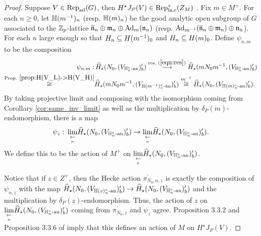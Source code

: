 \documentclass[10pt]{amsart}
\begin{document}
\begin{proof}
Suppose $V\in \textnormal{Rep}_{\textnormal{ad}}(G)$, then $H^{\star}J_{P}(V)\in \textnormal{Rep}_{\textnormal{la,c}}^{z}(Z_{M})$ \cite[Prop. 3.2.4]{Jacquet1}. Fix $m\in M^{+}$. For each $n\geq 0$, let $\mathbb{H}(m^{-1})_{n}$ (resp. $\mathbb{H}(m)_{n}$) be the good analytic open subgroup of $G$ associated to the $\mathbb{Z}_{p}$-lattice $\overline{\mathfrak{n}}_{n}\oplus \mathfrak{m}_{n} \oplus \textnormal{Ad}_{m}(\mathfrak{n}_{n})$ (resp. $\textnormal{Ad}_{m^{-1}}(\overline{\mathfrak{n}}_{n}\oplus \mathfrak{m}_{n}) \oplus \mathfrak{n}_{n}$). For each $n$ large enough so that $H_{n}\subseteq H(m^{-1})_{0}$ and $H_{n}\subseteq H(m)_{0}$. Define $\psi_{n,m}$ to be the composition \begin{equation*}\begin{split}
    \psi_{n,m}: &\, \widehat{H}_{\star}(N_{0},(V_{\mathbb{H}_{n}^{\circ}\textnormal{-an}})^{\prime}_{b}) \overset{\textnormal{res, }(\ref{eqn:res})}{\longrightarrow} \widehat{H}_{\star}(mN_{0}m^{-1},(V_{\mathbb{H}_{n}^{\circ}\textnormal{-an}})^{\prime}_{b})  \\ 
    \overset{\textnormal{Prop. } \ref{prop:H(V_L)->H(V_H)}}{\cong} &  \widehat{H}_{\star}(mN_{0}m^{-1},(V_{\mathbb{H}(m^{-1})_{n}^{\circ}\textnormal{-an}})^{\prime}_{b})\overset{m^{-1}}{\cong} \widehat{H}_{\star}(N_{0},(V_{\mathbb{H}(m)_{n}^{\circ}\textnormal{-an}})^{\prime}_{b}).
\end{split} 
\end{equation*} By taking projective limit and composing with the isomorphism coming from Corollary \ref{cor:same_inv_limit} as well as the multiplication by $\delta_{P}(m)$-endomorphism, there is a map \begin{equation*}
    \psi_{z}:\, \underset{\underset{n}{\leftarrow}}{\lim} \widehat{H}_{\star}(N_{0},(V_{\mathbb{H}_{n}^{\circ}\textnormal{-an}})^{\prime}_{b}) \rightarrow \underset{\underset{n}{\leftarrow}}{\lim} \widehat{H}_{\star}(N_{0},(V_{\mathbb{H}_{n}^{\circ}\textnormal{-an}})^{\prime}_{b}).
\end{equation*} We define this to be the action of $M^{+}$ on $\underset{\underset{n}{\leftarrow}}{\lim} \widehat{H}_{\star}(N_{0},(V_{\mathbb{H}_{n}^{\circ}\textnormal{-an}})^{\prime}_{b})$. 

Notice that if $z\in Z^{+}$, then the Hecke action $\pi_{N_{0},n,z}^{\prime}$ is exactly the composition of $\psi_{n,z}$ with the map $\widehat{H}_{\star}(N_{0},(V_{\mathbb{H}(z)_{n}^{\circ}\textnormal{-an}})^{\prime}_{b})\rightarrow \widehat{H}_{\star}(N_{0},(V_{\mathbb{H}_{n}^{\circ}\textnormal{-an}})^{\prime}_{b})$ and the multiplication by $\delta_{P}(z)$-endomorphism. Thus, the action of $z$ on $\underset{\underset{n}{\leftarrow}}{\lim} \widehat{H}_{\star}(N_{0},(V_{\mathbb{H}_{n}^{\circ}\textnormal{-an}})^{\prime}_{b})$ coming from $\pi_{N_{0},z}^{\prime}$ and $\psi_{z}$ agree. Proposition 3.3.2 and Proposition 3.3.6 of \cite{Jacquet1} imply that this defines an action of $M$ on $H^{\star}J_{P}(V)$. 


\end{proof}
\end{document}
